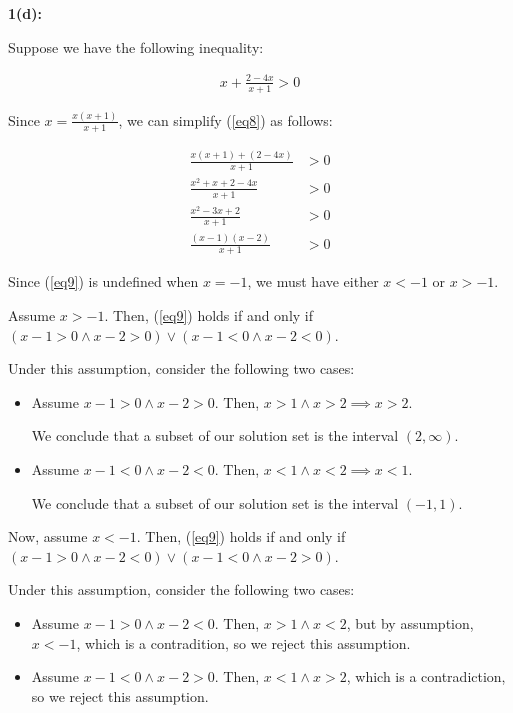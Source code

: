 \documentclass{article}
\begin{document}
\medskip
\textbf{1(d):}

Suppose we have the following inequality:

\begin{align} \label{eq8}
	x + \frac{2-4x}{x+1} > 0
\end{align}

Since $x = \frac{x(x+1)}{x+1}$,
we can simplify (\ref{eq8}) as follows:

\begin{align}
	\frac{x(x+1) + (2-4x)}{x+1} &> 0 \\
	\frac{x^2 + x + 2-4x}{x+1} &> 0 \\
	\frac{x^2 -3x + 2}{x+1} &> 0 \\
	\label{eq9}
	\frac{(x-1)(x-2)}{x+1} &> 0
\end{align}

Since (\ref{eq9}) is undefined when $x = -1$,
we must have either $x < -1$ or $x > -1$.

Assume $x > -1$.
Then, (\ref{eq9}) holds if and only if
$(x - 1 > 0 \land  x-2 > 0) \lor (x-1 < 0 \land x-2 < 0)$.

Under this assumption, consider the following two cases:

\begin{itemize}
	\item
Assume $x - 1 > 0 \land x - 2 > 0$.
Then, $x > 1 \land x > 2 \implies x > 2$.

We conclude that a subset of our solution set is the interval $(2, \infty)$.

\item
Assume $x - 1 < 0 \land x - 2 < 0$.
Then, $x < 1 \land x < 2 \implies x < 1$.

We conclude that a subset of our solution set is the interval $(-1, 1)$.
\end{itemize}

Now, assume $x < -1$.
Then, (\ref{eq9}) holds if and only if
$(x - 1 > 0 \land  x-2 < 0) \lor (x-1 < 0 \land x-2 > 0)$.

Under this assumption, consider the following two cases:

\begin{itemize}
	\item
	Assume $x - 1 > 0 \land x - 2 < 0$.
	Then, $x > 1 \land x < 2$,
	but by assumption, $x < -1$, which is a contradition,
	so we reject this assumption.
	\item
	Assume $x - 1 < 0 \land x - 2 > 0$.
	Then, $x < 1 \land x > 2$, which is a contradiction,
	so we reject this assumption.
\end{itemize}
\end{document}
